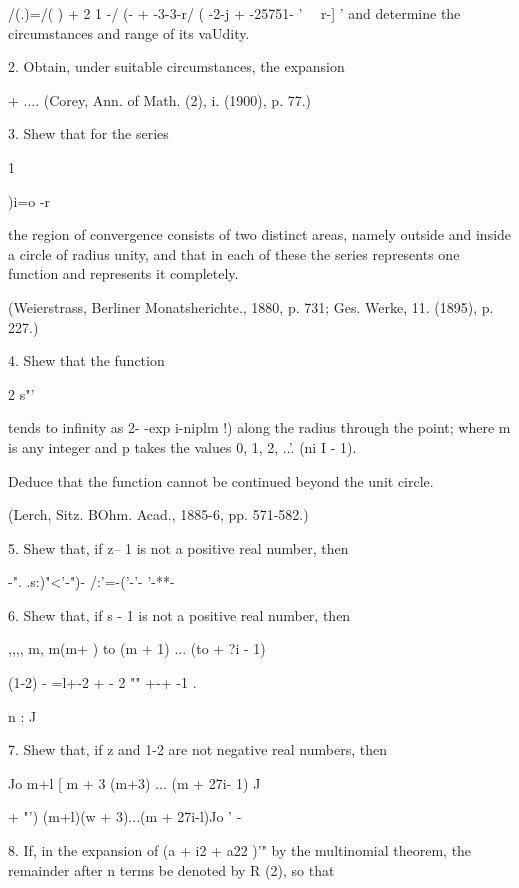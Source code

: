 {{{{/(.)=/( ) + 2 1 -/ (- + -3-3-r/ ( -2-j + -25751- ' \ \ r-] ' and
determine the circumstances and range of its vaUdity.

2. Obtain, under suitable circumstances, the expansion

+ .... (Corey, Ann. of Math. (2), i. (1900), p. 77.)

3. Shew that for the series

  1

)i=o -r~

the region of convergence consists of two distinct areas, namely
outside and inside a circle of radius unity, and that in each of these
the series represents one function and represents it completely.

(Weierstrass, Berliner Monatsherichte., 1880, p. 731; Ges. Werke, 11.
(1895), p. 227.)

4. Shew that the function

2 s"'

tends to infinity as 2- -exp i-niplm !) along the radius through the
point; where m is any integer and p takes the values 0, 1, 2, ..'.
(ni I - 1).

Deduce that the function cannot be continued beyond the unit circle.

(Lerch, Sitz. BOhm. Acad., 1885-6, pp. 571-582.)

5. Shew that, if z-- 1 is not a positive real number, then

-". .s:)"<'-")- /:'=-('-'- '-**-


%
%

6. Shew that, if s - 1 is not a positive real number, then

,,,, m, m(m+ ) to (m + 1) ... (to + ?i - 1)

(1-2) - =l+-2 + - 2 "" +-+ -1 .

n : J


7. Shew that, if z and 1-2 are not negative real numbers, then

  Jo m+l [ m + 3 (m+3) ... (m + 27i- 1) J

+ "') (m+l)(w + 3)...(m + 27i-l)Jo ' -


8. If, in the expansion of (a + i2 + a22 )'" by the multinomial
theorem, the remainder after n terms be denoted by R (2), so that

}}}}
